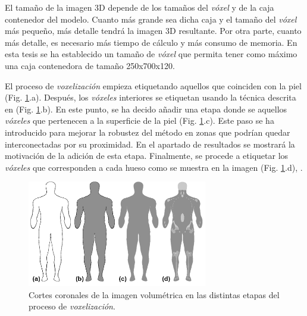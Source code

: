 El tamaño de la imagen 3D depende de los tamaños del \emph{vóxel} y de la caja contenedor del modelo. Cuanto más grande sea dicha caja y el tamaño del \emph{vóxel} más pequeño, más detalle tendrá la imagen 3D resultante. Por otra parte, cuanto más detalle, es necesario más tiempo de cálculo y más consumo de memoria. En esta tesis se ha establecido un tamaño de \emph{vóxel} que permita tener como máximo una caja contenedora de tamaño 250x700x120.

El proceso de \emph{voxelización} empieza etiquetando aquellos  que coinciden con la piel (Fig. \ref{fig:voxelizacion}.a). Después, los \emph{vóxeles} interiores se etiquetan usando la técnica descrita en \cite{SUZUKI20031} (Fig. \ref{fig:voxelizacion}.b). En este punto, se ha decido añadir una etapa donde se  aquellos \emph{vóxeles} que pertenecen a la superficie de la piel (Fig. \ref{fig:voxelizacion}.c). Este paso se ha introducido para mejorar la robustez del método en zonas que podrían quedar interconectadas por su proximidad. En el apartado de resultados se mostrará la motivación de la adición de esta etapa.  Finalmente, se procede a etiquetar los \emph{vóxeles} que corresponden a cada hueso como se muestra en la imagen (Fig. \ref{fig:voxelizacion}.d), . 
%
%
\begin{figure}[th]
   \centering
    \includegraphics[width=0.7\textwidth]{IMG/Volume2.png}
    \caption{
    Cortes coronales de la imagen volumétrica en las distintas etapas del proceso de \emph{voxelización}.}
\label{fig:voxelizacion}
\end{figure}


